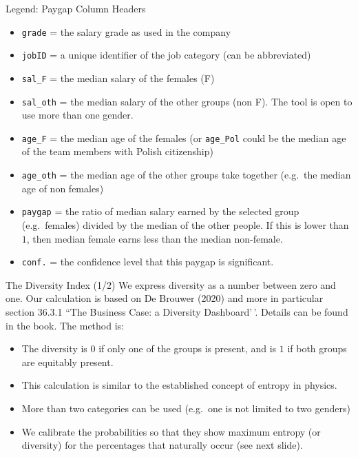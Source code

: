 \documentclass[
  ignorenonframetext,
  usenames,
  dvipsnames]{beamer}
\providecommand{\tightlist}{%
  \setlength{\itemsep}{0pt}\setlength{\parskip}{0pt}}
\begin{document}
\begin{frame}[fragile]{Legend: Paygap Column Headers}
\protect\hypertarget{legend-paygap-column-headers}{}
\small

\begin{itemize}
\tightlist
\item
  \texttt{grade} = the salary grade as used in the company
\item
  \texttt{jobID} = a unique identifier of the job category (can be
  abbreviated)
\item
  \texttt{sal\_F} = the median salary of the females (F)
\item
  \texttt{sal\_oth} = the median salary of the other groups (non F). The
  tool is open to use more than one gender.
\item
  \texttt{age\_F} = the median age of the females (or \texttt{age\_Pol}
  could be the median age of the team members with Polish citizenship)
\item
  \texttt{age\_oth} = the median age of the other groups take together
  (e.g.~the median age of non females)
\item
  \texttt{paygap} = the ratio of median salary earned by the selected
  group (e.g.~females) divided by the median of the other people. If
  this is lower than \(1\), then median female earns less than the
  median non-female.
\item
  \texttt{conf.} = the confidence level that this paygap is significant.
\end{itemize}
\end{frame}

\begin{frame}[shrink]{The Diversity Index (1/2)}
\protect\hypertarget{the-diversity-index-12}{}
We express diversity as a number between zero and one. Our calculation
is based on De Brouwer (2020) and more in particular section 36.3.1
``The Business Case: a Diversity Dashboard'\,'. Details can be found in
the book. The method is:

\begin{itemize}
\tightlist
\item
  The diversity is \(0\) if only one of the groups is present, and is
  \(1\) if both groups are equitably present.
\item
  This calculation is similar to the established concept of entropy in
  physics.
\item
  More than two categories can be used (e.g.~one is not limited to two
  genders)
\item
  We calibrate the probabilities so that they show maximum entropy (or
  diversity) for the percentages that naturally occur (see next slide).
\end{itemize}
\end{frame}
\end{document}
